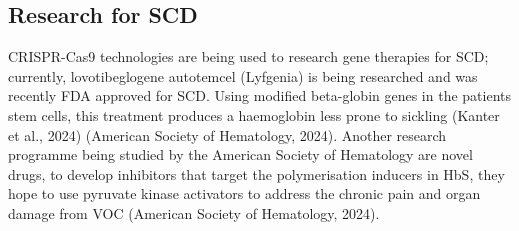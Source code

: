 \documentclass{mva_style}
\begin{document}
\subsection{Research for SCD}
CRISPR-Cas9 technologies are being used to research gene therapies for SCD; currently, lovotibeglogene autotemcel (Lyfgenia) is being researched and was recently FDA approved for SCD. Using modified beta-globin genes in the patients stem cells, this treatment produces a haemoglobin less prone to sickling (Kanter et al., 2024) (American Society of Hematology, 2024).
Another research programme being studied by the American Society of Hematology are novel drugs, to develop inhibitors that target the polymerisation inducers in HbS, they hope to use pyruvate kinase activators to address the chronic pain and organ damage from VOC (American Society of Hematology, 2024).
\end{document}
